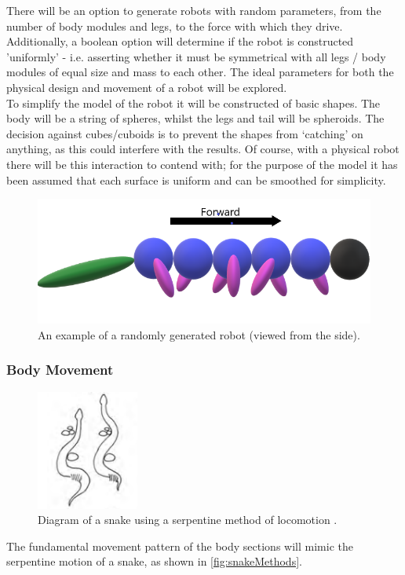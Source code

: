 \documentclass{article}
\begin{document}
There will be an option to generate robots with random parameters, from the number of body modules and legs, to the force with which they drive. Additionally, a boolean option will determine if the robot is constructed 'uniformly' - i.e. asserting whether it must be symmetrical with all legs / body modules of equal size and mass to each other. The ideal parameters for both the physical design and movement of a robot will be explored.\\

To simplify the model of the robot it will be constructed of basic shapes. The body will be a string of spheres, whilst the legs and tail will be spheroids. The decision against cubes/cuboids is to prevent the shapes from ‘catching’ on anything, as this could interfere with the results. Of course, with a physical robot there will be this interaction to contend with; for the purpose of the model it has been assumed that each surface is uniform and can be smoothed for simplicity. \\

\begin{figure}[H]
\centering
\includegraphics[scale=0.5]{robotDesign}
\caption{An example of a randomly generated robot (viewed from the side).}
\end{figure}

\newpage
\subsubsection{Body Movement}
\label{sec:Body Movement}
\begin{figure}
    \centering
    \vspace*{-5mm}
    \includegraphics[width=0.3\textwidth]{serpentine}
    \vspace*{-7mm}
\caption{Diagram of a snake using a serpentine method of locomotion \citep{reptileLocomotion}.}
    \label{fig:snakeMethods}
\end{figure}
The fundamental movement pattern of the body sections will mimic the serpentine motion of a snake, as shown in \autoref{fig:snakeMethods}.
\end{document}
